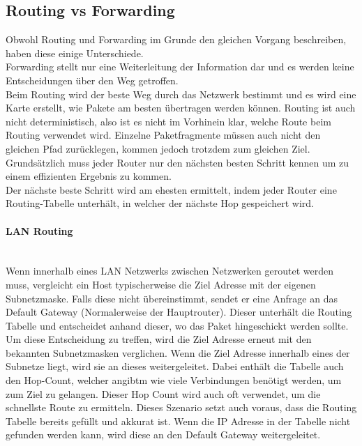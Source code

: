 \documentclass{article}
\newcommand{\paragraphlb}[1]{\paragraph{#1}\mbox{}\\}
\begin{document}
	 \subsection{Routing vs Forwarding}
	 Obwohl Routing und Forwarding im Grunde den gleichen Vorgang beschreiben, haben diese einige Unterschiede. \\
	 Forwarding stellt nur eine Weiterleitung der Information dar und es werden keine Entscheidungen über den Weg getroffen. \\
	 Beim Routing wird der beste Weg durch das Netzwerk bestimmt und es wird eine Karte erstellt, wie Pakete am besten übertragen werden können. Routing ist auch nicht deterministisch, also ist es nicht im Vorhinein klar, welche Route beim Routing verwendet wird. Einzelne Paketfragmente müssen auch nicht den gleichen Pfad zurücklegen, kommen jedoch trotzdem zum gleichen Ziel. Grundsätzlich muss jeder Router nur den nächsten besten Schritt kennen um zu einem effizienten Ergebnis zu kommen. \\
	 Der nächste beste Schritt wird am ehesten ermittelt, indem jeder Router eine Routing-Tabelle unterhält, in welcher der nächste Hop gespeichert wird. \\
	 \paragraphlb{LAN Routing}
	 Wenn innerhalb eines LAN Netzwerks zwischen Netzwerken geroutet werden muss, vergleicht ein Host typischerweise die Ziel Adresse mit der eigenen Subnetzmaske. Falls diese nicht übereinstimmt, sendet er eine Anfrage an das Default Gateway (Normalerweise der Hauptrouter). Dieser unterhält die Routing Tabelle und entscheidet anhand dieser, wo das Paket hingeschickt werden sollte. Um diese Entscheidung zu treffen, wird die Ziel Adresse erneut mit den bekannten Subnetzmasken verglichen. Wenn die Ziel Adresse innerhalb eines der Subnetze liegt, wird sie an dieses weitergeleitet. Dabei enthält die Tabelle auch den Hop-Count, welcher angibtm wie viele Verbindungen benötigt werden, um zum Ziel zu gelangen. Dieser Hop Count wird auch oft verwendet, um die schnellste Route zu ermitteln. Dieses Szenario setzt auch voraus, dass die Routing Tabelle bereits gefüllt und akkurat ist. Wenn die IP Adresse in der Tabelle nicht gefunden werden kann, wird diese an den Default Gateway weitergeleitet. \\
\end{document}
